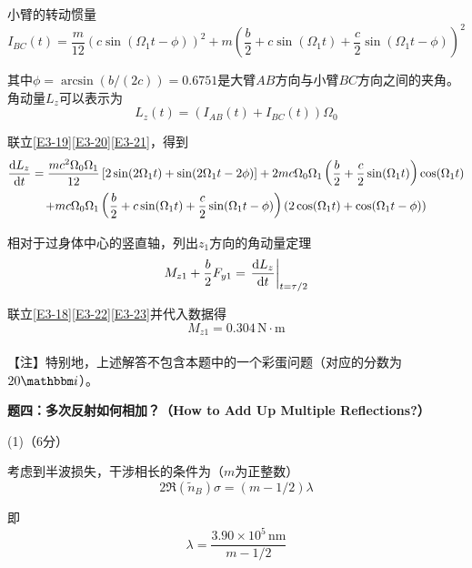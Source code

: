 \documentclass[10pt,a4paper,onecolumn,UTF8]{ctexart}
\begin{document}
	小臂的转动惯量
	\begin{equation}\label{E3-20}
		I_{BC}(t)=\frac{m}{12}(c\sin(\Omega_1t-\phi))^2+m\left(\frac b 2+c\sin(\Omega_1t)+\frac c 2\sin(\Omega_1t-\phi)\right)^2
	\end{equation}
	
	其中$\phi=\arcsin(b/(2c))=0.6751$是大臂$AB$方向与小臂$BC$方向之间的夹角。角动量$L_z$可以表示为
	\begin{equation}\label{E3-21}
		L_z(t)=(I_{AB}(t)+I_{BC}(t))\Omega_0
	\end{equation}
	
	联立\eqref{E3-19}\eqref{E3-20}\eqref{E3-21}，得到
	\begin{multline}\label{E3-22}
		\frac{\mathrm{d} L_z}{\mathrm{d} t}=\frac{mc^2\Omega_0\Omega_1}{12}\left[2\sin(2\Omega_1t)+\sin(2\Omega_1t-2\phi)\right]+2mc\Omega_0\Omega_1\left(\frac b 2+\frac c 2\sin(\Omega_1t)\right)\cos(\Omega_1t)\\+mc\Omega_0\Omega_1\left(\frac b 2+c\sin(\Omega_1t)+\frac c 2\sin(\Omega_1t-\phi)\right)\left(2\cos(\Omega_1t)+\cos(\Omega_1t-\phi)\right)
	\end{multline}
	
	相对于过身体中心的竖直轴，列出$z_1$方向的角动量定理
	\begin{equation}\label{E3-23}
		M_{z1}+\frac b 2F_{y1}=\left.\frac{\mathrm{d} L_z}{\mathrm{d} t}\right|_{t=\tau/2}
	\end{equation}
	
	联立\eqref{E3-18}\eqref{E3-22}\eqref{E3-23}并代入数据得
	\begin{equation}
		M_{z1}=0.304\,\text{N}\cdot\text{m}
	\end{equation}\\
	
	【注】特别地，上述解答不包含本题中的一个彩蛋问题（对应的分数为$20\ui$）。
	
	
	\setcounter{equation}{0}
	\newpage
	
	\noindent
	\textbf{题四：多次反射如何相加？（How to Add Up Multiple Reflections?）}
	
	(1)（6分）
	
	考虑到半波损失，干涉相长的条件为（$m$为正整数）
	\begin{equation}
		2\Re(\tilde{n}_B)\sigma=(m-1/2)\lambda
	\end{equation}
	
	即
	\begin{equation}
		\lambda=\frac{3.90\times10^{5}\,\text{nm}}{m-1/2}
	\end{equation}
	
\end{document}
